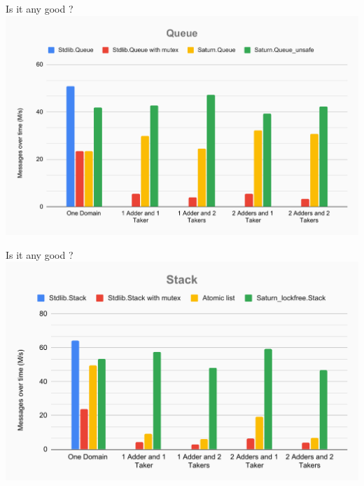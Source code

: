 
  \begin{frame}{Is it any good ?}
    \centering\includegraphics[width=0.8\linewidth]{images/Queue.pdf}
 \end{frame}


 \begin{frame}{Is it any good ?}
\centering
    \includegraphics[width=0.8\linewidth]{images/Stack.pdf}
  \end{frame}
